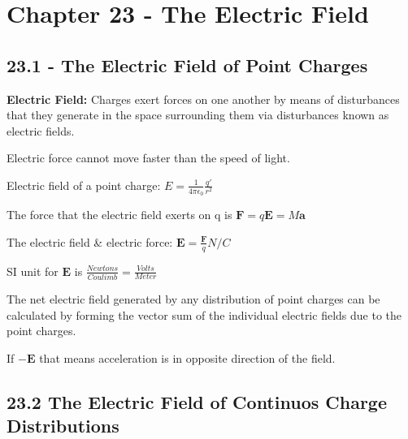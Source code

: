\documentclass[twocolumn]{article}
\newenvironment{small_item}{
\begin{itemize}
  \setlength{\itemsep}{.25pt}
  \setlength{\parskip}{0pt}
  \setlength{\parsep}{0pt}
}{\end{itemize}}
\begin{document}
	
	\section*{Chapter 23 - The Electric Field} %
	\label{sec:chapter_23_the_electric_field}
	
	\subsection*{23.1 - The Electric Field of Point Charges} %
	\label{sub:23_1_the_electric_field_of_point_charges}
	
	\begin{small_item}
		\item \textbf{Electric Field:} Charges exert forces on one another by means of disturbances that they generate in the space surrounding them via disturbances known as electric fields.
		\item Electric force cannot move faster than the speed of light.
		\item Electric field of a point charge: $E = \frac{1}{4\pi\epsilon_0}\frac{q'}{r^2}$
		\item The force that the electric field exerts on q is $\mathbf{F} = q\mathbf{E} = M\mathbf{a}$
		\item The electric field \& electric force: $\mathbf{E} = \frac{\mathbf{F}}{q}N/C$
		\item SI unit for $\mathbf{E}$ is $\frac{Newtons}{Coulimb} = \frac{Volts}{Meter}$
		\item The net electric field generated by any distribution of point charges can be calculated by forming the vector sum of the individual electric fields due to the point charges.
		\item If $-\mathbf{E}$ that means acceleration is in opposite direction of the field.
	\end{small_item}
	
	\subsection*{23.2 The Electric Field of Continuos Charge Distributions} %
	\label{sub:23_2_the_electric_field_of_continous_charge_distributions}
	
\end{document}

